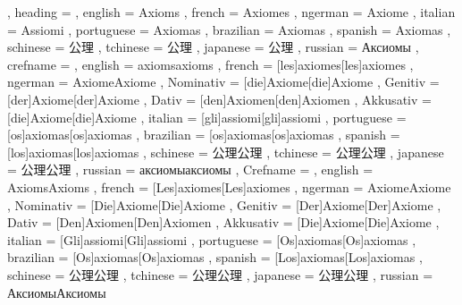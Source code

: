   {
    , heading =   {
                    , english     = Axioms
                    , french      = Axiomes
                    , ngerman     = Axiome
                    , italian     = Assiomi
                    , portuguese  = Axiomas
                    , brazilian   = Axiomas
                    , spanish     = Axiomas
                    , schinese    = 公理
                    , tchinese    = 公理
                    , japanese    = 公理
                    , russian     = Аксиомы
                  }
    , crefname =  {
                    , english     = {axioms}{axioms}
                    , french      = [les]{axiomes}[les]{axiomes}
                    , ngerman     = { {Axiome}{Axiome}
                                      , Nominativ = [die]{Axiome}[die]{Axiome}
                                      , Genitiv   = [der]{Axiome}[der]{Axiome}
                                      , Dativ     = [den]{Axiomen}[den]{Axiomen}
                                      , Akkusativ = [die]{Axiome}[die]{Axiome}
                                    }
                    , italian     = [gli]{assiomi}[gli]{assiomi}
                    , portuguese  = [os]{axiomas}[os]{axiomas}
                    , brazilian   = [os]{axiomas}[os]{axiomas}
                    , spanish     = [los]{axiomas}[los]{axiomas}
                    , schinese    = {公理}{公理}
                    , tchinese    = {公理}{公理}
                    , japanese    = {公理}{公理}
                    , russian     = {аксиомы}{аксиомы}
                  }
    , Crefname =  {
                    , english     = {Axioms}{Axioms}
                    , french      = [Les]{axiomes}[Les]{axiomes}
                    , ngerman     = { {Axiome}{Axiome}
                                      , Nominativ = [Die]{Axiome}[Die]{Axiome}
                                      , Genitiv   = [Der]{Axiome}[Der]{Axiome}
                                      , Dativ     = [Den]{Axiomen}[Den]{Axiomen}
                                      , Akkusativ = [Die]{Axiome}[Die]{Axiome}
                                    }
                    , italian     = [Gli]{assiomi}[Gli]{assiomi}
                    , portuguese  = [Os]{axiomas}[Os]{axiomas}
                    , brazilian   = [Os]{axiomas}[Os]{axiomas}
                    , spanish     = [Los]{axiomas}[Los]{axiomas}
                    , schinese    = {公理}{公理}
                    , tchinese    = {公理}{公理}
                    , japanese    = {公理}{公理}
                    , russian     = {Аксиомы}{Аксиомы}
                  }
  }

